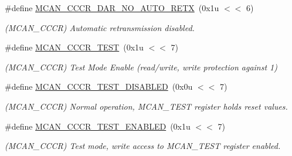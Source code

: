 \begin{DoxyCompactItemize}
\mbox{\label{group__SAMV71__MCAN_ga6d5b5023117eeabb099c655c532d01af}} 
\#define \mbox{\hyperlink{group__SAMV71__MCAN_ga6d5b5023117eeabb099c655c532d01af}{M\+C\+A\+N\+\_\+\+C\+C\+C\+R\+\_\+\+D\+A\+R\+\_\+\+N\+O\+\_\+\+A\+U\+T\+O\+\_\+\+R\+E\+TX}}~(0x1u $<$$<$ 6)
\begin{DoxyCompactList}\small\item\em (M\+C\+A\+N\+\_\+\+C\+C\+CR) Automatic retransmission disabled. \end{DoxyCompactList}\item 
\mbox{\label{group__SAMV71__MCAN_ga67951c94eec9d0fade4d5468caa63897}} 
\#define \mbox{\hyperlink{group__SAMV71__MCAN_ga67951c94eec9d0fade4d5468caa63897}{M\+C\+A\+N\+\_\+\+C\+C\+C\+R\+\_\+\+T\+E\+ST}}~(0x1u $<$$<$ 7)
\begin{DoxyCompactList}\small\item\em (M\+C\+A\+N\+\_\+\+C\+C\+CR) Test Mode Enable (read/write, write protection against \textquotesingle{}1\textquotesingle{}) \end{DoxyCompactList}\item 
\mbox{\label{group__SAMV71__MCAN_ga39b644871c9b60e756955d614c844d87}} 
\#define \mbox{\hyperlink{group__SAMV71__MCAN_ga39b644871c9b60e756955d614c844d87}{M\+C\+A\+N\+\_\+\+C\+C\+C\+R\+\_\+\+T\+E\+S\+T\+\_\+\+D\+I\+S\+A\+B\+L\+ED}}~(0x0u $<$$<$ 7)
\begin{DoxyCompactList}\small\item\em (M\+C\+A\+N\+\_\+\+C\+C\+CR) Normal operation, M\+C\+A\+N\+\_\+\+T\+E\+ST register holds reset values. \end{DoxyCompactList}\item 
\mbox{\label{group__SAMV71__MCAN_ga49fd510567cc1b2312bd98e29587153f}} 
\#define \mbox{\hyperlink{group__SAMV71__MCAN_ga49fd510567cc1b2312bd98e29587153f}{M\+C\+A\+N\+\_\+\+C\+C\+C\+R\+\_\+\+T\+E\+S\+T\+\_\+\+E\+N\+A\+B\+L\+ED}}~(0x1u $<$$<$ 7)
\begin{DoxyCompactList}\small\item\em (M\+C\+A\+N\+\_\+\+C\+C\+CR) Test mode, write access to M\+C\+A\+N\+\_\+\+T\+E\+ST register enabled. \end{DoxyCompactList}\item 
\mbox{\label{group__SAMV71__MCAN_gabb79a8bacc6a07f3160203ff2eae8e57}} 

\end{DoxyCompactItemize}
